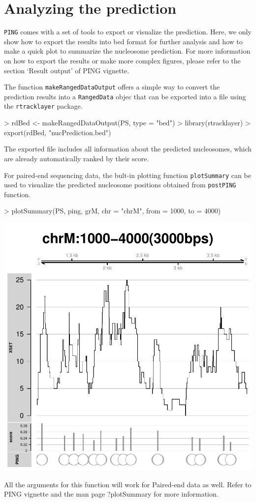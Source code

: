 \documentclass[11pt]{article}
\begin{document}
\section{Analyzing the prediction}
\texttt{PING} comes with a set of tools to export or visualize the prediction.
Here, we only show how to export the results into bed format for further analysis and how to make a quick plot to summarize the nucleosome prediction. For more information on how to export the results or make more complex figures, please refer to the section `Result output' of PING vignette.

The function \texttt{makeRangedDataOutput} offers a simple way to convert the prediction results into a \texttt{RangedData} objec that can be exported into a file using the \texttt{rtracklayer} package. 

\begin{Schunk}
\begin{Sinput}
> rdBed <- makeRangedDataOutput(PS, type = "bed")
> library(rtracklayer)
> export(rdBed, "nucPrediction.bed")
\end{Sinput}
\end{Schunk}
The exported file includes all information about the predicted nucleosomes, which are already automatically ranked by their score. 

\vspace{10pt}
For paired-end sequencing data, the bult-in plotting function \texttt{plotSummary} can be used to visualize the predicted nucleosome positions obtained from \texttt{postPING} function. 


\begin{Schunk}
\begin{Sinput}
> plotSummary(PS, ping, grM, chr = "chrM", from = 1000, to = 4000)
\end{Sinput}
\end{Schunk}
\includegraphics{PING-PE-plotSummary-PE}

All the arguments for this function will work for Paired-end data as well. Refer to PING vignette and  the man page ?plotSummary for more information.
\end{document}
